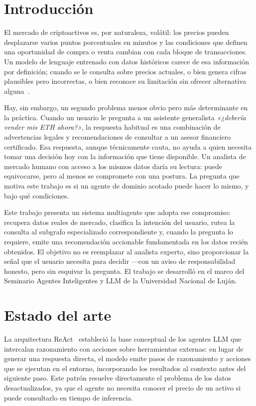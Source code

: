 \documentclass[runningheads]{llncs}
\begin{document}
\section{Introducción}

El mercado de criptoactivos es, por naturaleza, volátil: los precios pueden desplazarse
varios puntos porcentuales en minutos y las condiciones que definen una oportunidad de
compra o venta cambian con cada bloque de transacciones. Un modelo de lenguaje entrenado
con datos históricos carece de esa información por definición; cuando se le consulta sobre
precios actuales, o bien genera cifras plausibles pero incorrectas, o bien reconoce su
limitación sin ofrecer alternativa alguna~\cite{ji2023survey}.

Hay, sin embargo, un segundo problema menos obvio pero más determinante en la práctica.
Cuando un usuario le pregunta a un asistente generalista \emph{«¿debería vender mis ETH
ahora?»}, la respuesta habitual es una combinación de advertencias legales y
recomendaciones de consultar a un asesor financiero certificado. Esa respuesta, aunque
técnicamente cauta, no ayuda a quien necesita tomar una decisión hoy con la información
que tiene disponible. Un analista de mercado humano con acceso a los mismos datos daría su
lectura: puede equivocarse, pero al menos se compromete con una postura. La pregunta que
motiva este trabajo es si un agente de dominio acotado puede hacer lo mismo, y bajo qué
condiciones.

Este trabajo presenta un sistema multiagente que adopta ese compromiso: recupera datos
reales de mercado, clasifica la intención del usuario, rutea la consulta al subgrafo
especializado correspondiente y, cuando la pregunta lo requiere, emite una recomendación
accionable fundamentada en los datos recién obtenidos. El objetivo no es reemplazar al
analista experto, sino proporcionar la señal que el usuario necesita para decidir —con un
aviso de responsabilidad honesto, pero sin esquivar la pregunta. El trabajo se desarrolló
en el marco del Seminario Agentes Inteligentes y LLM de la Universidad Nacional de Luján.

\section{Estado del arte}

La arquitectura ReAct~\cite{yao2023react} estableció la base conceptual de los agentes LLM
que intercalan razonamiento con acciones sobre herramientas externas: en lugar de generar
una respuesta directa, el modelo emite pasos de razonamiento y acciones que se ejecutan en
el entorno, incorporando los resultados al contexto antes del siguiente paso. Este patrón
resuelve directamente el problema de los datos desactualizados, ya que el agente no
necesita conocer el precio de un activo si puede consultarlo en tiempo de inferencia.
\end{document}
